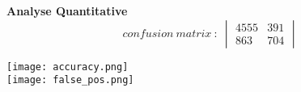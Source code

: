 \documentclass{article}
\begin{document}
\begin{adjustwidth}{-60pt}{-70pt}
\begin{singlespace}
\begin{tcolorbox}[title=\textbf{Model Card -Antoine Savage-Duguay},
    breakable, sharp corners, boxrule=0.7pt]
{\textbf{Analyse Quantitative}
    $$confusion \ matrix \ : \ \begin{vmatrix}
        4555 & 391 \\
        863 & 704 
    \end{vmatrix}$$


\texttt{[image: accuracy.png]}\\[0.3cm]
\texttt{[image: false\_pos.png]}\\[0.2cm]


} %
\end{tcolorbox}
\end{singlespace}
\end{adjustwidth}
\end{document}
